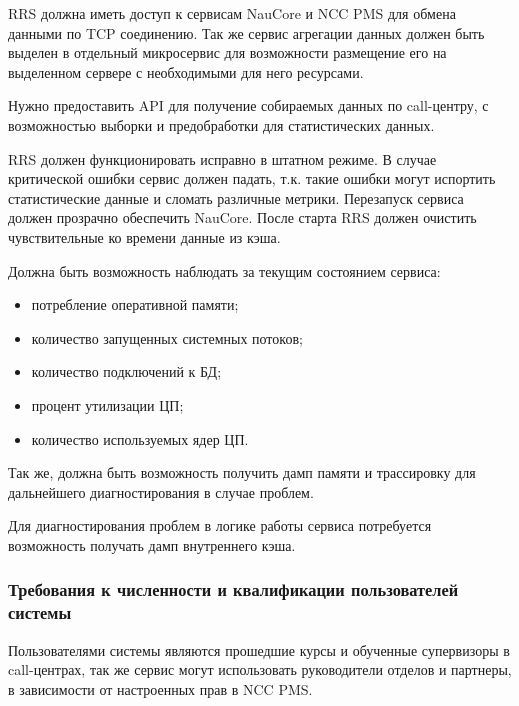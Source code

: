 RRS должна иметь доступ к сервисам NauCore и NCC PMS для обмена данными по TCP соединению.
Так же сервис агрегации данных должен быть выделен в отдельный микросервис для возможности размещение его на выделенном сервере с необходимыми для него ресурсами.

Нужно предоставить API для получение собираемых данных по call-центру,
с возможностью выборки и предобработки для статистических данных.

RRS должен функционировать исправно в штатном режиме.
В случае критической ошибки сервис должен падать,
т.к. такие ошибки могут испортить статистические данные и сломать различные метрики.
Перезапуск сервиса должен прозрачно обеспечить NauCore.
После старта RRS должен очистить чувствительные ко времени данные из кэша.

Должна быть возможность наблюдать за текущим состоянием сервиса:
\begin{itemize}
    \item потребление оперативной памяти;
    \item количество запущенных системных потоков;
    \item количество подключений к БД;
    \item процент утилизации ЦП;
    \item количество используемых ядер ЦП.
\end{itemize}

Так же, должна быть возможность получить дамп памяти и трассировку для дальнейшего диагностирования в случае проблем.

Для диагностирования проблем в логике работы сервиса потребуется возможность получать дамп внутреннего кэша.

\subsubsection{Требования к численности и квалификации пользователей системы} %

Пользователями системы являются прошедшие курсы и обученные супервизоры в call-центрах,
так же сервис могут использовать руководители отделов и партнеры,
в зависимости от настроенных прав в NCC PMS\@.

